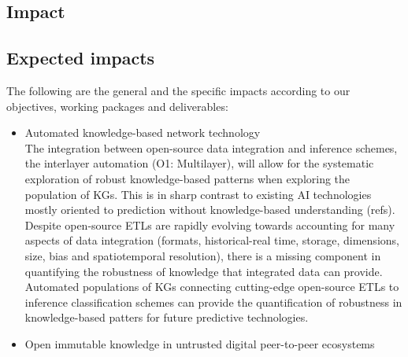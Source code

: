\documentclass[12pt, a4paper]{article} %
\begin{document}
\begin{itemize}
\section{Impact}

\subsection{Expected impacts}


The following are the general and the specific impacts according to our objectives, working packages and deliverables:

\begin{itemize}
\item Automated knowledge-based network technology\\
  
  The integration between open-source data integration and inference
  schemes, the interlayer automation (O1: Multilayer), will allow for
  the systematic exploration of robust knowledge-based patterns when
  exploring the population of KGs. This is in sharp contrast to
  existing AI technologies mostly oriented to prediction without
  knowledge-based understanding (refs). Despite open-source ETLs are
  rapidly evolving towards accounting for many aspects of data
  integration (formats, historical-real time, storage, dimensions,
  size, bias and spatiotemporal resolution), there is a missing
  component in quantifying the robustness of knowledge that integrated
  data can provide. Automated populations of KGs connecting
  cutting-edge open-source ETLs to inference classification schemes
  can provide the quantification of robustness in knowledge-based
  patters for future predictive technologies.

\item Open immutable knowledge in untrusted digital peer-to-peer ecosystems\\
  

\end{itemize}
\end{itemize}
\end{document}
